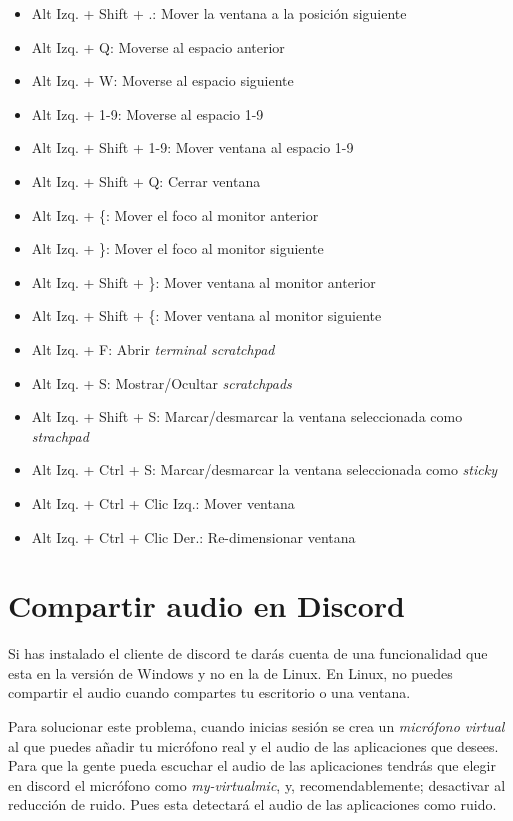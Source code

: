 \documentclass[12pt]{article}
\begin{document}
\begin{itemize}
\item Alt Izq. + Shift + .: Mover la ventana a la posición siguiente
\item Alt Izq. + Q: Moverse al espacio anterior
\item Alt Izq. + W: Moverse al espacio siguiente
\item Alt Izq. + 1-9: Moverse al espacio 1-9
\item Alt Izq. + Shift + 1-9: Mover ventana al espacio 1-9
\item Alt Izq. + Shift + Q: Cerrar ventana
\item Alt Izq. + \{: Mover el foco al monitor anterior
\item Alt Izq. + \}: Mover el foco al monitor siguiente
\item Alt Izq. + Shift + \}: Mover ventana al monitor anterior
\item Alt Izq. + Shift + \{: Mover ventana al monitor siguiente
\item Alt Izq. + F: Abrir \emph{terminal scratchpad}
\item Alt Izq. + S: Mostrar/Ocultar \emph{scratchpads}
\item Alt Izq. + Shift + S: Marcar/desmarcar la ventana seleccionada como \emph{strachpad}
\item Alt Izq. + Ctrl + S: Marcar/desmarcar la ventana seleccionada como \emph{sticky}
\item Alt Izq. + Ctrl + Clic Izq.: Mover ventana
\item Alt Izq. + Ctrl + Clic Der.: Re-dimensionar ventana
\end{itemize}

\section{Compartir audio en Discord}

Si has instalado el cliente de discord te darás cuenta de una funcionalidad que esta en la versión de Windows y no en la de Linux. En Linux, no puedes compartir el audio cuando compartes tu escritorio o una ventana.

Para solucionar este problema, cuando inicias sesión se crea un \emph{micrófono virtual} al que puedes añadir tu micrófono real y el audio de las aplicaciones que desees. Para que la gente pueda escuchar el audio de las aplicaciones tendrás que elegir en discord el micrófono como \emph{my-virtualmic}, y, recomendablemente; desactivar al reducción de ruido. Pues esta detectará el audio de las aplicaciones como ruido.
\end{document}
